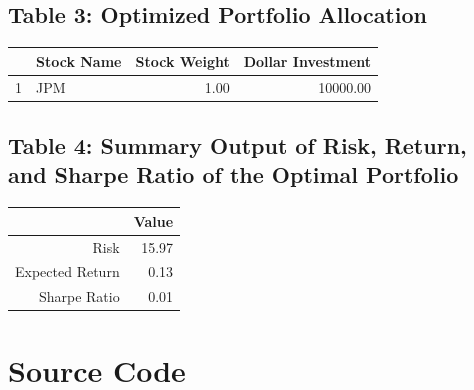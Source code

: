 \documentclass[12pt,english]{article}
\begin{document}
        \subsection{Table 3: Optimized Portfolio Allocation}
                \begin{table}[H]
                \centering
                \begin{tabular}{rlrr}
                  \hline
                 & Stock Name & Stock Weight & Dollar Investment \\ 
                  \hline
                1 & JPM & 1.00 & 10000.00 \\ 
                   \hline
                \end{tabular}
                \end{table}
                
        \subsection{Table 4: Summary Output of Risk, Return, and Sharpe Ratio of the Optimal Portfolio}
                \begin{table}[H]
                \centering
                \begin{tabular}{rr}
                  \hline
                 & Value \\ 
                  \hline
                Risk & 15.97 \\ 
                  Expected Return & 0.13 \\ 
                  Sharpe Ratio & 0.01 \\ 
                   \hline
                \end{tabular}
                \end{table}
    
    \newpage\section{Source Code}

    \lstset{basicstyle=\small,
            columns=fullflexible,
            frame=single,
            breaklines=true}

    \begin{singlespacing}    
        
    \end{singlespacing}
    
    
\end{document}
